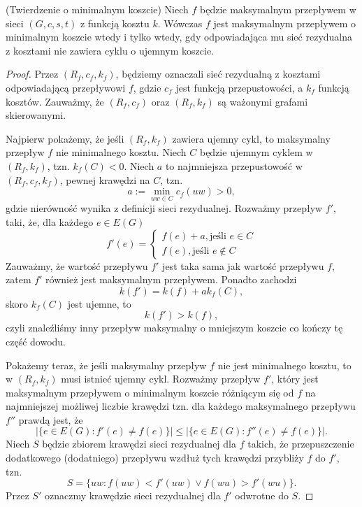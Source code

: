 \begin{theorem}
	(Twierdzenie o minimalnym koszcie) Niech $f$ będzie
	maksymalnym przepływem w sieci $(G, c, s, t)$ z funkcją 
	kosztu $k$. Wówczas $f$ jest maksymalnym przepływem 
	o minimalnym koszcie wtedy i tylko wtedy, gdy 
	odpowiadająca mu sieć rezydualna z kosztami
	nie zawiera cyklu o ujemnym koszcie.
	\begin{proof}
		Przez $(R_f, c_f, k_f)$, będziemy oznaczali sieć rezydualną
		z kosztami odpowiadającą przepływowi $f$, gdzie $c_f$ 
		jest funkcją przepustowości, a $k_f$ funkcją kosztów.
		Zauważmy, że $(R_f, c_f)$ oraz $(R_f, k_f)$ są ważonymi 
		grafami skierowanymi.
		
		Najpierw pokażemy, że jeśli $(R_f, k_f)$ zawiera ujemny cykl,
		to maksymalny przepływ $f$ nie minimalnego kosztu.
		Niech $C$ będzie ujemnym cyklem w $(R_f, k_f)$, tzn. $k_f(C) < 0$.
		Niech $a$ to najmniejsza przepustowość w $(R_f, c_f, k_f)$, pewnej
		krawędzi na $C$, tzn.
		\[a := \min_{uw \in C} c_f(uw) > 0,\]
		gdzie nierówność wynika z definicji sieci rezydualnej. Rozważmy 
		przepływ $f'$, taki, że, dla każdego
		$e \in E(G)$
		\[f'(e) = \begin{cases} 
			f(e) + a, \text{jeśli } e \in C \\
			f(e), \text{jeśli } e \not \in C 
		\end{cases}\]
		Zauważmy, że wartość przepływu $f'$ jest taka sama
		jak wartość przepływu $f$, zatem $f'$ również jest
		maksymalnym przepływem. Ponadto zachodzi 
		\[k(f') = k(f) + ak_f(C),\]
		skoro $k_f(C)$ jest ujemne, to 
		\[k(f') > k(f),\]
		czyli znaleźliśmy inny przepływ maksymalny o mniejszym koszcie
		co kończy tę część dowodu.
		
		Pokażemy teraz, że jeśli maksymalny przepływ $f$
		nie jest minimalnego kosztu, to w $(R_f, k_f)$ musi istnieć
		ujemny cykl. Rozważmy przepływ $f'$, który jest
		maksymalnym przepływem o minimalnym koszcie różniącym
		się od $f$ na najmniejszej możliwej liczbie krawędzi tzn.
		dla każdego maksymalnego przepływu $f''$ prawdą jest, że
		\[|\{e \in E(G) : f'(e) \not = f(e)\}| \leq 
		|\{e \in E(G) : f''(e) \not = f(e)\}|.\]
		Niech $S$ będzie zbiorem krawędzi sieci rezydualnej dla $f$ 
		takich, że przepuszczenie dodatkowego (dodatniego)
		przepływu wzdłuż tych krawędzi przybliży $f$ do $f'$, tzn.
		\[S = \{uw : f(uw) < f'(uw) \lor f(wu) > f'(wu)\}.\]
		Przez $S'$ oznaczmy krawędzie sieci rezydualnej dla $f'$
		odwrotne do $S$.
		

\end{proof}
\end{theorem}
